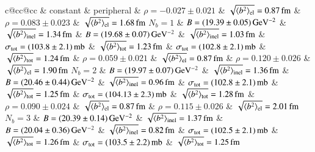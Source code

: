 \begin{table}
\caption{%
, parcmp fits as in Figures~\ref{fig:fits common con} and \ref{fig:fits common per}
}%
\label{tab:fits common}
\begin{center}
\small
\setlength{\tabcolsep}{5pt}
\begin{tabular}{c@{\hskip20pt}cc@{\hskip20pt}cc}
\hline
\hline
	& \hfil constant \hfil & \hfil peripheral \hfil  \cr
\hline
 			& $\rho = -0.027 \pm 0.021$ & $\sqrt{\langle b^2\rangle_{\rm el}} = 0.87\,{\rm fm}$					& $\rho = 0.083 \pm 0.023$ & $\sqrt{\langle b^2\rangle_{\rm el}} = 1.68\,{\rm fm}$					\cr
$N_b = 1$	& $B = (19.39 \pm 0.05)\,{\rm GeV^{-2}}$ & $\sqrt{\langle b^2\rangle_{\rm inel}} = 1.34\,{\rm fm}$		& $B = (19.68 \pm 0.07)\,{\rm GeV^{-2}}$ & $\sqrt{\langle b^2\rangle_{\rm inel}} = 1.03\,{\rm fm}$		\cr
			& $\sigma_{\rm tot} = (103.8 \pm 2.1)\,{\rm mb}$ & $\sqrt{\langle b^2\rangle_{\rm tot}} = 1.23\,{\rm fm}$	& $\sigma_{\rm tot} = (102.8 \pm 2.1)\,{\rm mb}$ & $\sqrt{\langle b^2\rangle_{\rm tot}} = 1.24\,{\rm fm}$	\cr\hline
%                                                                                                                                                                                                                   
 			& $\rho = 0.059 \pm 0.021$ & $\sqrt{\langle b^2\rangle_{\rm el}} = 0.87\,{\rm fm}$						& $\rho = 0.120 \pm 0.026$ & $\sqrt{\langle b^2\rangle_{\rm el}} = 1.90\,{\rm fm}$						\cr
$N_b = 2$	& $B = (19.97 \pm 0.07)\,{\rm GeV^{-2}}$ & $\sqrt{\langle b^2\rangle_{\rm inel}} = 1.36\,{\rm fm}$		& $B = (20.46 \pm 0.44)\,{\rm GeV^{-2}}$ & $\sqrt{\langle b^2\rangle_{\rm inel}} = 0.96\,{\rm fm}$		\cr
			& $\sigma_{\rm tot} = (102.8 \pm 2.1)\,{\rm mb}$ & $\sqrt{\langle b^2\rangle_{\rm tot}} = 1.25\,{\rm fm}$	& $\sigma_{\rm tot} = (104.13 \pm 2.3)\,{\rm mb}$ & $\sqrt{\langle b^2\rangle_{\rm tot}} = 1.28\,{\rm fm}$	\cr\hline
%                                                                                                                                                                                                                   
 			& $\rho = 0.090 \pm 0.024$ & $\sqrt{\langle b^2\rangle_{\rm el}} = 0.87\,{\rm fm}$						& $\rho = 0.115 \pm 0.026$ & $\sqrt{\langle b^2\rangle_{\rm el}} = 2.01\,{\rm fm}$						\cr
$N_b = 3$	& $B = (20.39 \pm 0.14)\,{\rm GeV^{-2}}$ & $\sqrt{\langle b^2\rangle_{\rm inel}} = 1.37\,{\rm fm}$		& $B = (20.04 \pm 0.36)\,{\rm GeV^{-2}}$ & $\sqrt{\langle b^2\rangle_{\rm inel}} = 0.82\,{\rm fm}$		\cr
			& $\sigma_{\rm tot} = (102.5 \pm 2.1)\,{\rm mb}$ & $\sqrt{\langle b^2\rangle_{\rm tot}} = 1.26\,{\rm fm}$	& $\sigma_{\rm tot} = (103.5 \pm 2.2)\,{\rm mb}$ & $\sqrt{\langle b^2\rangle_{\rm tot}} = 1.25\,{\rm fm}$	\cr\hline
\hline
\hline
\end{tabular}
\end{center}
\end{table}



